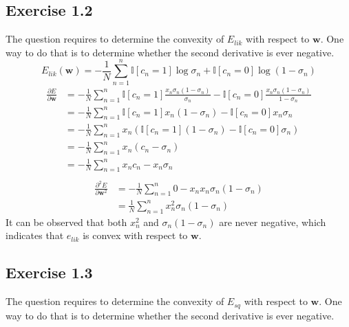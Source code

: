 \documentclass[fleqn]{report}
\renewcommand{\vec}[1]{\mathbf{#1}}
\begin{document}
\subsection*{Exercise 1.2}
The question requires to determine the convexity of $E_{lik}$ with respect to $\vec{w}$. One way to do that is to determine whether the second derivative is ever negative.
\begin{equation}
    E_{lik} (\vec{w}) =
    - \frac{1}{N} \sum_{n=1}^n
    \mathbb{I}[c_n = 1] \log \sigma_n
    + \mathbb{I}[c_n = 0] \log \left ( 1 - \sigma_n \right )
\end{equation}
\begin{equation}
    \begin{split}
        \frac{\partial E}{\partial \vec{w}} & =
        - \frac{1}{N} \sum_{n=1}^n
        \mathbb{I}[c_n = 1]
        \frac{x_n \sigma_n (1 - \sigma_n)}{\sigma_n}
        - \mathbb{I}[c_n = 0]
        \frac{x_n \sigma_n (1 - \sigma_n)}{1 - \sigma_n} \\
        & = - \frac{1}{N} \sum_{n=1}^n
        \mathbb{I}[c_n = 1]
        x_n (1 - \sigma_n)
        - \mathbb{I}[c_n = 0]
        x_n \sigma_n  \\
        & = - \frac{1}{N} \sum_{n=1}^n
        x_n \left ( \mathbb{I} [c_n = 1]
        (1 - \sigma_n)
        - \mathbb{I}[c_n = 0]
        \sigma_n \right ) \\
        & = - \frac{1}{N} \sum_{n=1}^n
        x_n ( c_n - \sigma_n ) \\
        & = - \frac{1}{N} \sum_{n=1}^n
        x_n c_n - x_n \sigma_n \\
    \end{split}
\end{equation}
\begin{equation}
    \begin{split}
        \frac{\partial ^2 E}{\partial \vec{w}^2} & = 
        - \frac{1}{N} \sum_{n=1}^n
        0 - x_n x_n \sigma_n (1 - \sigma_n) \\
        & = \frac{1}{N} \sum_{n=1}^n
        x_n^2 \sigma_n (1 - \sigma_n)
    \end{split}
\end{equation}
It can be observed that both $x_n^2$ and $\sigma_n (1 - \sigma_n)$ are never negative, which indicates that $e_{lik}$ is convex with respect to $\vec{w}$.

\subsection*{Exercise 1.3}
The question requires to determine the convexity of $E_{sq}$ with respect to $\vec{w}$. One way to do that is to determine whether the second derivative is ever negative.
\end{document}
